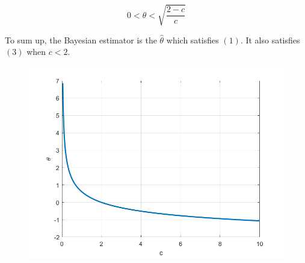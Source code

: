 \documentclass[11pt]{article}
\begin{document}
\begin{enumerate}
    \begin{equation}
        0 < \hat{\theta} < \sqrt{\frac{2-c}{c}}
    \end{equation}

    To sum up, the Bayesian estimator is the $\hat{\theta}$ which satisfies $(1)$. It also satisfies $(3)$ when $c<2$.

    \begin{figure}[h]
        \centering
        \includegraphics[width=1.\textwidth]{Question 3.png}
    \end{figure}
    
\end{enumerate}
\end{document}
